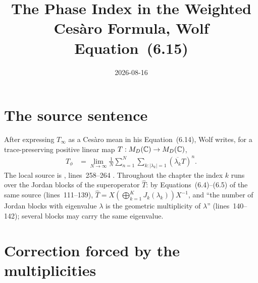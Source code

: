 \documentclass{article}
\title{The Phase Index in the Weighted Ces\`aro Formula, Wolf Equation~(6.15)}
\author{}
\date{2026-08-16}
\begin{document}
\maketitle
{}

\section{The source sentence}

After expressing $T_\infty$ as a Ces\`aro mean in his Equation~(6.14), Wolf
writes, for a trace-preserving positive linear map $T:M_{D}(\mathbb{C})\to M_{D}(\mathbb{C})$,
\begin{align}
  T_\phi
  & = \lim_{N\to\infty}\frac{1}{N}\sum_{n=1}^N
  \sum_{k:|\lambda_k|=1} (\overline{\lambda_k}T)^n.
  \tag{Wolf eq.~6.15}
\end{align}
The local source is
,
lines~258--264 \cite{Wolf2012Quantum}. Throughout the chapter the index $k$
runs over the Jordan blocks of the superoperator $\widehat T$: by
Equations~(6.4)--(6.5) of the same source (lines~111--139),
$\widehat T=X(\bigoplus_{k=1}^K J_k(\lambda_k))X^{-1}$, and ``the number of
Jordan blocks with eigenvalue $\lambda$ is the geometric multiplicity of
$\lambda$'' (lines~140--142); several blocks may carry the same eigenvalue.

\section{Correction forced by the multiplicities}
\end{document}
